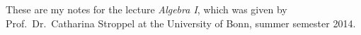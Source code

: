 These are my notes for the lecture \emph{Algebra I}, which was given by Prof.\ Dr.\ Catharina Stroppel at the University of Bonn, summer semester 2014.